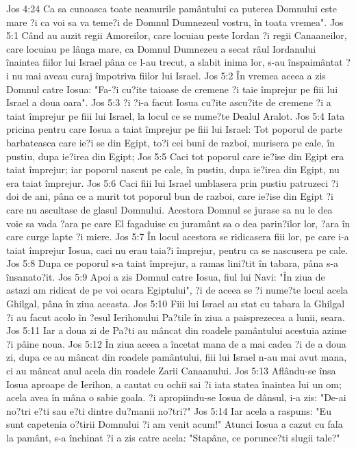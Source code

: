 Jos 4:24  Ca sa cunoasca toate neamurile pamântului ca puterea Domnului este mare ?i ca voi sa va teme?i de Domnul Dumnezeul vostru, în toata vremea".
Jos 5:1  Când au auzit regii Amoreilor, care locuiau peste Iordan ?i regii Canaaneilor, care locuiau pe lânga mare, ca Domnul Dumnezeu a secat râul Iordanului înaintea fiilor lui Israel pâna ce l-au trecut, a slabit inima lor, s-au înspaimântat ?i nu mai aveau curaj împotriva fiilor lui Israel.
Jos 5:2  În vremea aceea a zis Domnul catre Iosua: "Fa-?i cu?ite taioase de cremene ?i taie împrejur pe fiii lui Israel a doua oara".
Jos 5:3  ?i ?i-a facut Iosua cu?ite ascu?ite de cremene ?i a taiat împrejur pe fiii lui Israel, la locul ce se nume?te Dealul Aralot.
Jos 5:4  Iata pricina pentru care Iosua a taiat împrejur pe fiii lui Israel: Tot poporul de parte barbateasca care ie?i se din Egipt, to?i cei buni de razboi, murisera pe cale, în pustiu, dupa ie?irea din Egipt;
Jos 5:5  Caci tot poporul care ie?ise din Egipt era taiat împrejur; iar poporul nascut pe cale, în pustiu, dupa ie?irea din Egipt, nu era taiat împrejur.
Jos 5:6  Caci fiii lui Israel umblasera prin pustiu patruzeci ?i doi de ani, pâna ce a murit tot poporul bun de razboi, care ie?ise din Egipt ?i care nu ascultase de glasul Domnului. Acestora Domnul se jurase sa nu le dea voie sa vada ?ara pe care El fagaduise cu juramânt sa o dea parin?ilor lor, ?ara în care curge lapte ?i miere.
Jos 5:7  În locul acestora se ridicasera fiii lor, pe care i-a taiat împrejur Iosua, caci nu erau taia?i împrejur, pentru ca se nascusera pe cale.
Jos 5:8  Dupa ce poporul s-a taiat împrejur, a ramas lini?tit în tabara, pâna s-a însanato?it.
Jos 5:9  Apoi a zis Domnul catre Iosua, fiul lui Navi: "În ziua de astazi am ridicat de pe voi ocara Egiptului", ?i de aceea se ?i nume?te locul acela Ghilgal, pâna în ziua aceasta.
Jos 5:10  Fiii lui Israel au stat cu tabara la Ghilgal ?i au facut acolo în ?esul Ierihonului Pa?tile în ziua a paisprezecea a lunii, seara.
Jos 5:11  Iar a doua zi de Pa?ti au mâncat din roadele pamântului acestuia azime ?i pâine noua.
Jos 5:12  În ziua aceea a încetat mana de a mai cadea ?i de a doua zi, dupa ce au mâncat din roadele pamântului, fiii lui Israel n-au mai avut mana, ci au mâncat anul acela din roadele Zarii Canaanului.
Jos 5:13  Aflându-se însa Iosua aproape de Ierihon, a cautat cu ochii sai ?i iata statea înaintea lui un om; acela avea în mâna o sabie goala. ?i apropiindu-se Iosua de dânsul, i-a zis: "De-ai no?tri e?ti sau e?ti dintre du?manii no?tri?"
Jos 5:14  Iar acela a raspuns: "Eu sunt capetenia o?tirii Domnului ?i am venit acum!" Atunci Iosua a cazut cu fala la pamânt, s-a închinat ?i a zis catre acela: "Stapâne, ce porunce?ti slugii tale?"
